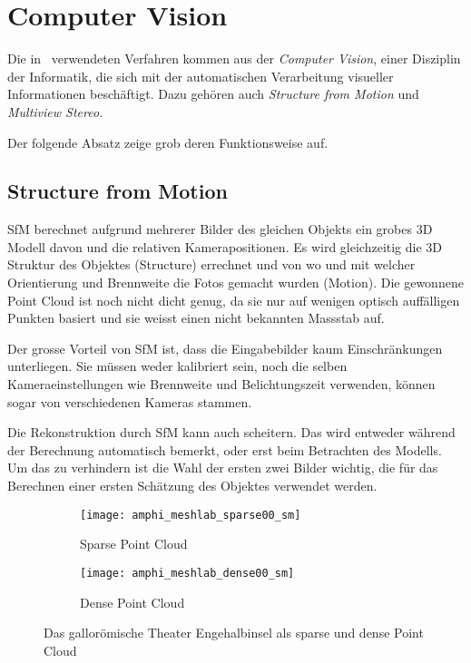 	\section{Computer Vision}
		Die in \dronarch\ verwendeten Verfahren kommen aus der \emph{Computer Vision}, einer Disziplin der Informatik, die sich mit der automatischen Verarbeitung visueller Informationen beschäftigt. Dazu gehören auch \emph{Structure from Motion} und \emph{Multiview Stereo}.

		Der folgende Absatz zeige grob deren Funktionsweise auf. %
		
		\subsection{Structure from Motion} \label{sfm}
			SfM berechnet aufgrund mehrerer Bilder des gleichen Objekts ein grobes 3D Modell davon und die relativen Kamerapositionen. Es wird gleichzeitig die 3D Struktur des Objektes (Structure) errechnet und von wo und mit welcher Orientierung und Brennweite die Fotos gemacht wurden (Motion).
			Die gewonnene Point Cloud ist noch nicht dicht genug, da sie nur auf wenigen optisch auffälligen Punkten basiert und sie weisst einen nicht bekannten Massstab auf.
			
			Der grosse Vorteil von SfM ist, dass die Eingabebilder kaum Einschränkungen unterliegen. Sie müssen weder kalibriert sein, noch die selben Kameraeinstellungen wie Brennweite und Belichtungszeit verwenden, können sogar von verschiedenen Kameras stammen.
			
			Die Rekonstruktion durch SfM kann auch scheitern. Das wird entweder während der Berechnung automatisch bemerkt, oder erst beim Betrachten des Modells. Um das zu verhindern ist die Wahl der ersten zwei Bilder wichtig, die für das Berechnen einer ersten Schätzung des Objektes verwendet werden. %
			\begin{figure}
				\begin{subfigure}{0.5\textwidth}
					\texttt{[image: amphi\_meshlab\_sparse00\_sm]}
					\caption{Sparse Point Cloud}
					\label{amphi_sparse}
				\end{subfigure}
				\begin{subfigure}{0.5\textwidth}
					\texttt{[image: amphi\_meshlab\_dense00\_sm]}
					\caption{Dense Point Cloud}
					\label{amphi_dense}
				\end{subfigure}
				\caption{Das gallorömische Theater Engehalbinsel als sparse und dense Point Cloud}
				\label{amphi_pointclouds}
			\end{figure}			
